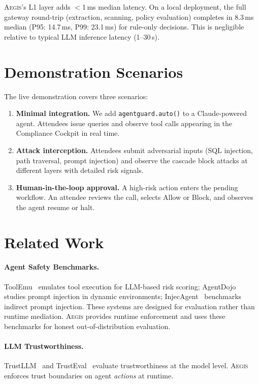 \documentclass[sigconf,nonacm]{acmart}
\newcommand{\system}{\textsc{Aegis}\xspace}
\begin{document}
\system's L1 layer adds $<$1\,ms median latency. On a local deployment, the full gateway round-trip (extraction, scanning, policy evaluation) completes in 8.3\,ms median (P95: 14.7\,ms, P99: 23.1\,ms) for rule-only decisions. This is negligible relative to typical LLM inference latency (1--30\,s).

\section{Demonstration Scenarios}

The live demonstration covers three scenarios:
\begin{enumerate}[nolistsep, leftmargin=*]
\item \textbf{Minimal integration.} We add \texttt{agentguard.auto()} to a Claude-powered agent. Attendees issue queries and observe tool calls appearing in the Compliance Cockpit in real time.
\item \textbf{Attack interception.} Attendees submit adversarial inputs (SQL injection, path traversal, prompt injection) and observe the cascade block attacks at different layers with detailed risk signals.
\item \textbf{Human-in-the-loop approval.} A high-risk action enters the pending workflow. An attendee reviews the call, selects Allow or Block, and observes the agent resume or halt.
\end{enumerate}

\section{Related Work}
\label{sec:related}

\paragraph{Agent Safety Benchmarks.}
ToolEmu~\cite{ruan2024toolemu} emulates tool execution for LLM-based risk scoring; AgentDojo~\cite{debenedetti2024agentsec} studies prompt injection in dynamic environments; InjecAgent~\cite{zhan2024injecagent} benchmarks indirect prompt injection. These systems are designed for evaluation rather than runtime mediation. \system provides runtime enforcement and uses these benchmarks for honest out-of-distribution evaluation.

\paragraph{LLM Trustworthiness.}
TrustLLM~\cite{huang2024position} and TrustEval~\cite{wang2024trusteval} evaluate trustworthiness at the model level. \system enforces trust boundaries on agent \emph{actions} at runtime.
\end{document}
